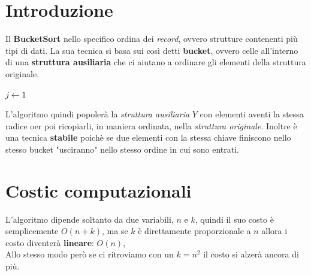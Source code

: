 \documentclass{article}
\begin{document}
\section*{Introduzione}

Il \textbf{BucketSort} nello specifico ordina dei \textit{record}, ovvero 
strutture contenenti più tipi di dati. La sua tecnica si basa sui così detti
\textbf{bucket}, ovvero celle all'interno di una \textbf{struttura ausiliaria} che ci 
aiutano a ordinare gli elementi della struttura originale.

\vspace{0.3cm}
\begin{algorithm}[H]
\caption{\textsc{BucketSort}($A, n, k$)}


\BlankLine



\BlankLine


\BlankLine

$j \gets 1$\;

\end{algorithm}
\vspace{0.3cm}

L'algoritmo quindi popolerà la \textit{struttura ausiliaria} $Y$ con elementi aventi la stessa radice 
oer poi ricopiarli, in maniera ordinata, nella \textit{struttura originale}.
Inoltre è una tecnica \textbf{stabile} poichè se due elementi con la stessa chiave finiscono
nello stesso bucket "usciranno" nello stesso ordine in cui sono entrati.

\section*{Costic computazionali}
L'algoritmo dipende soltanto da due variabili, $n$ e $k$, quindi il suo costo è semplicemente 
$O(n + k)$, ma se $k$ è direttamente proporzionale a $n$ allora i costo diventerà \textbf{lineare}:
$O(n)$, \\
Allo stesso modo però se ci ritroviamo con un $k = n^2$ il costo si alzerà ancora di più. 
\end{document}
